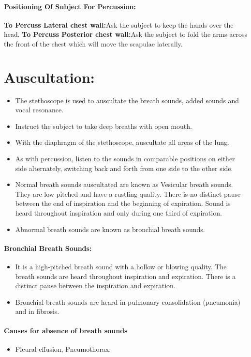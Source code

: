 \documentclass[a4paper,12pt]{book}
\begin{document}
\paragraph{Positioning Of Subject For Percussion:}
\textbf{To Percuss Lateral chest wall:}Ask the subject to keep the hands over the head.
\textbf{To Percuss Posterior chest wall:}Ask the subject to fold the arms across the front of the chest which will move the scapulae laterally.

\section*{Auscultation:}
\begin{itemize}
\item{The  stethoscope  is  used  to  auscultate  the  breath  sounds,  added  sounds  and  vocal resonance.}
\item{Instruct the subject to take deep breaths with open mouth.}
\item{With the diaphragm of the stethoscope, auscultate all areas of the lung.}
\item{As with percussion, listen to the sounds in comparable positions on either side alternately, switching back and forth from one side to the other side.}
\item{Normal breath sounds auscultated are known as Vesicular breath sounds. They are low pitched and have a rustling quality. There is no distinct pause between the end of inspiration and the beginning of expiration. Sound is heard throughout inspiration and only during one third of expiration.}
\item{Abnormal breath sounds are known as bronchial breath sounds.}
\end{itemize}

\paragraph{Bronchial Breath Sounds:}
\begin{itemize}
\item{It is a high-pitched breath sound with a hollow or blowing quality. The breath sounds are heard throughout inspiration and expiration. There is a distinct pause between the inspiration and expiration.}
\item{Bronchial breath sounds are heard in pulmonary consolidation (pneumonia) and in fibrosis.}
\end{itemize}

\paragraph{Causes for absence of breath sounds}
\begin{itemize}
	\item[]Pleural effusion, Pneumothorax.
\end{itemize}
\end{document}
